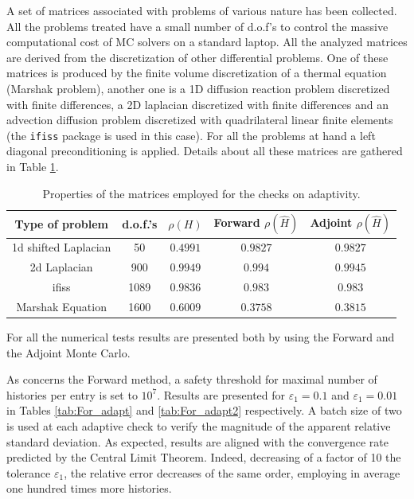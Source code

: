 \documentclass[a4paper,10pt]{article}
\begin{document}
A set of matrices associated with problems of various nature has been collected.
All the problems treated have a small number of d.o.f's to control the
massive computational cost of MC solvers on a standard laptop. All the analyzed
matrices are derived from the
discretization of other differential problems.
One of these matrices is produced by the finite volume discretization of
a thermal equation (Marshak problem), another one is a 1D diffusion reaction
problem discretized with finite differences, a
2D laplacian discretized with finite differences and an advection
diffusion
problem discretized with quadrilateral linear finite elements (the
\texttt{ifiss} package is used in this case).
For all the problems at hand a left diagonal preconditioning is applied.
Details about all these matrices are gathered in Table
\ref{table_data}.

\begin{table}[!h]
\centering
\begin{tabular}{|c|c|c|c|c|}
\hline
\textbf{Type of problem} & \textbf{d.o.f.'s} &
$\rho(H)$&Forward $\rho(\hat{H})$&Adjoint $\rho(\hat{H})$\\
\hline
1d shifted Laplacian & 50 & $0.4991$ & $0.9827$ & $0.9827$\\
\hline
2d Laplacian & 900 & $0.9949$ & $0.994$ & $0.9945$\\
\hline
ifiss & 1089 &$0.9836$ & $0.983$ & $0.983$ \\
\hline
Marshak Equation & 1600 & $0.6009$ & $0.3758$ & $ 0.3815$ \\
\hline
\end{tabular}
\caption{Properties of the matrices employed for the checks on adaptivity.}
\label{table_data}
\end{table}

For all the numerical tests results are presented both by using the Forward
and the Adjoint Monte Carlo.

As concerns the Forward method, a safety threshold for maximal number of
histories per
entry is set to $10^7$. Results are presented for
$\varepsilon_1=0.1$ and $\varepsilon_1=0.01$ in Tables \ref{tab:For_adapt} and
\ref{tab:For_adapt2} respectively. A batch size of two is used at each
adaptive check to verify the magnitude of the apparent relative standard
deviation. As expected, results are aligned with the convergence rate predicted
by the Central Limit Theorem. Indeed, decreasing of a factor of 10 the
tolerance $\varepsilon_1$, the relative error decreases of the same order,
employing in average one hundred times more histories.\newline
\end{document}
